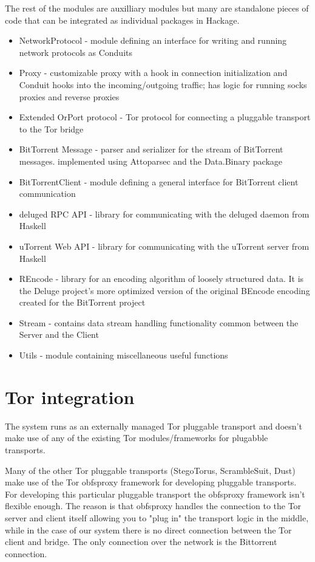 \documentclass[11pt]{book} %
\begin{document}
The rest of the modules are auxilliary modules but many are standalone pieces of code that can be integrated as individual packages in Hackage.

\begin{itemize}
\item NetworkProtocol - module defining an interface for writing and running network protocols as Conduits
\item Proxy - customizable proxy with a hook in connection initialization and Conduit hooks into the incoming/outgoing traffic; has logic for running socks proxies and reverse proxies
\item Extended OrPort protocol  - Tor protocol for connecting a pluggable transport to the Tor bridge
\item BitTorrent Message  - parser and serializer for the stream of BitTorrent messages. implemented using Attoparsec and the Data.Binary package
\item BitTorrentClient - module defining a general interface for BitTorrent client communication
\item deluged RPC API - library for communicating with the deluged daemon from Haskell
\item uTorrent Web API - library for communicating with the uTorrent server from Haskell
\item REncode - library for an encoding algorithm of loosely structured data. It is the Deluge project's more optimized version of the original BEncode encoding created for the BitTorrent project 
\item Stream - contains data stream handling functionality common between the Server and the Client
\item Utils - module containing miscellaneous useful functions
\end{itemize}


\section{Tor integration}

The system runs as an externally managed Tor pluggable transport and doesn't make use of any of the existing Tor modules/frameworks for plugabble transports.

Many of the other Tor pluggable transports (StegoTorus, ScrambleSuit, Dust) make use of the Tor obfsproxy  framework for developing pluggable transports. For developing this particular pluggable transport the obfsproxy framework isn't flexible enough. The reason is that obfsproxy handles the connection to the Tor server and client itself allowing you to "plug in" the transport logic in the middle, while in the case of our system there is no direct connection between the Tor client and bridge. The only connection over the network is the Bittorrent connection.
\end{document}
